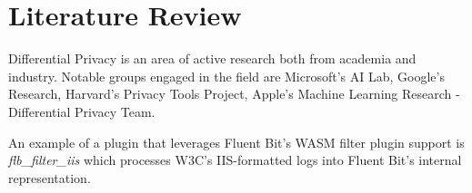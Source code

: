 \chapter{Literature Review\label{chap:lit-review}}

Differential Privacy is an area of active research both from academia and industry. Notable groups engaged in the field are Microsoft's AI Lab, Google's Research, Harvard's Privacy Tools Project, Apple's Machine Learning Research - Differential Privacy Team. 

An example of a plugin that leverages Fluent Bit's WASM filter plugin support is \textit{flb\_filter\_iis}\cite{Ortega} which processes W3C's IIS-formatted logs into Fluent Bit's internal representation.